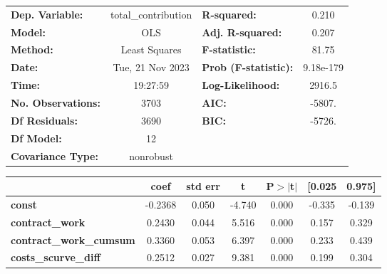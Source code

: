 \begin{center}
\begin{tabular}{lclc}
\toprule
\textbf{Dep. Variable:}                   & total\_contribution & \textbf{  R-squared:         } &     0.210   \\
\textbf{Model:}                           &         OLS         & \textbf{  Adj. R-squared:    } &     0.207   \\
\textbf{Method:}                          &    Least Squares    & \textbf{  F-statistic:       } &     81.75   \\
\textbf{Date:}                            &   Tue, 21 Nov 2023  & \textbf{  Prob (F-statistic):} & 9.18e-179   \\
\textbf{Time:}                            &       19:27:59      & \textbf{  Log-Likelihood:    } &    2916.5   \\
\textbf{No. Observations:}                &          3703       & \textbf{  AIC:               } &    -5807.   \\
\textbf{Df Residuals:}                    &          3690       & \textbf{  BIC:               } &    -5726.   \\
\textbf{Df Model:}                        &            12       & \textbf{                     } &             \\
\textbf{Covariance Type:}                 &      nonrobust      & \textbf{                     } &             \\
\bottomrule
\end{tabular}
\begin{tabular}{lcccccc}
                                          & \textbf{coef} & \textbf{std err} & \textbf{t} & \textbf{P$> |$t$|$} & \textbf{[0.025} & \textbf{0.975]}  \\
\midrule
\textbf{const}                            &      -0.2368  &        0.050     &    -4.740  &         0.000        &       -0.335    &       -0.139     \\
\textbf{contract\_work}                   &       0.2430  &        0.044     &     5.516  &         0.000        &        0.157    &        0.329     \\
\textbf{contract\_work\_cumsum}           &       0.3360  &        0.053     &     6.397  &         0.000        &        0.233    &        0.439     \\
\textbf{costs\_scurve\_diff}              &       0.2512  &        0.027     &     9.381  &         0.000        &        0.199    &        0.304     \\

\end{tabular}
\end{center}
